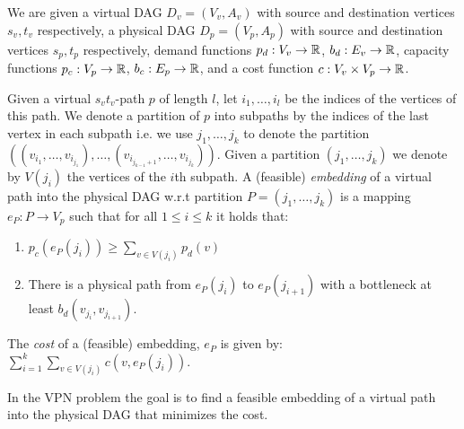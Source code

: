 We are given a virtual DAG $D_v = (V_v, A_v)$ 
with source and destination vertices $s_v, t_v$ respectively, 
a physical DAG $D_p = (V_p, A_p)$
with source and destination vertices $s_p, t_p$ respectively,
demand functions $p_d : V_v \to \mathbb{R}$, $b_d : E_v \to \mathbb{R}$,
capacity functions $p_c : V_p \to \mathbb{R}$, $b_c : E_p \to \mathbb{R}$,
and a cost function $c: V_v \times V_p \to \mathbb{R}$. 

Given a virtual $s_vt_v$-path $p$ of length $l$,
let $i_1, \ldots, i_l$ be the indices of the vertices of this path.
We denote a partition of $p$ into subpaths by the indices of the last vertex in
each subpath i.e. we use $j_1, \ldots, j_k$ to denote the partition 
$((v_{i_1}, \ldots, v_{i_{j_1}}), \ldots, (v_{i_{j_{k-1} + 1}}, \ldots,
v_{i_{j_k}}))$.
Given a partition $(j_1, \ldots, j_k)$ we denote by $V(j_i)$ the vertices of the
$i$th subpath.
A (feasible) \emph{embedding} of a virtual path into the physical DAG 
w.r.t partition $P = (j_1, \ldots,j_k)$ is a mapping $e_P : P \to V_p$ such that
for all $1 \leq i \leq k$ it holds that:
\begin{enumerate}
  \item $p_c(e_P(j_i)) \geq \sum_{v \in V(j_i)} p_d(v)$
  \item There is a physical path from $e_P(j_i)$ to $e_P(j_{i+1})$ with a
  bottleneck at least $b_d(v_{j_i}, v_{j_{i+1}})$.
\end{enumerate}
The \emph{cost} of a (feasible) embedding, $e_P$ is given by:
$\sum_{i = 1}^k \sum_{v \in V(j_i)} c(v, e_P(j_i))$.   

In the  VPN problem the goal is to find a
feasible embedding of a virtual path into the physical DAG that minimizes the
cost.

\begin{figure}[ht]
\centering
\scalebox{1}{

}

\end{figure}
